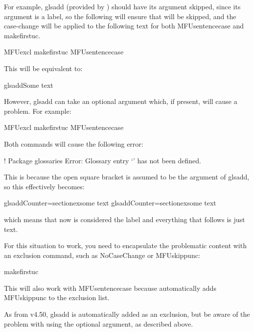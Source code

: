 \documentclass[titlepage=false,oneside,
 fontsize=12pt,captions=tableheading]{scrbook}
\begin{document}
For example, \gls{glsadd} (provided by ) should have
its argument skipped, since its argument is a label, so the
following will ensure that  will be
skipped, and the case-change will be applied to the following text
for both \gls{MFUsentencecase} and \gls{makefirstuc}.
\begin{codebox}
\gls{MFUexcl}
\gls{makefirstuc}
\gls{MFUsentencecase}
\end{codebox}
This will be equivalent to:
\begin{compactcodebox}
\gls{glsadd}Some text
\end{compactcodebox}
However, \gls{glsadd} can take an optional argument which, if
present, will cause a problem. For example:
\begin{badcodebox}
\gls{MFUexcl}
\gls{makefirstuc}
\gls{MFUsentencecase}
\end{badcodebox}
Both commands will cause the following error:
\begin{transcript}
! Package glossaries Error: Glossary entry `\nlctopensqbracket' has not been defined.
\end{transcript}
This is because the open square bracket is assumed to be the
argument of \gls{glsadd}, so this effectively becomes:
\begin{compactcodebox}
\gls{glsadd}\marg{\nlctopensqbracket}Counter=section\nlctclosesqbracket exsome text
\gls{glsadd}\marg{\nlctopensqbracket}Counter=section\nlctclosesqbracket exsome text
\end{compactcodebox}
which means that now \code{\nlctopensqbracket} is considered the label and everything
that follows is just text.

For this situation to work, you need to encapsulate the problematic
content with an exclusion command, such as \gls{NoCaseChange} or \gls{MFUskippunc}:
\begin{codebox}
\gls{makefirstuc}
\end{codebox}
This will also work with \gls{MFUsentencecase} because
 automatically adds \gls{MFUskippunc} to the exclusion
list.

\begin{information}
As from  v4.50, \gls{glsadd} is automatically added
as an exclusion, but be aware of the problem with using the optional
argument, as described above.
\end{information}
\end{document}
